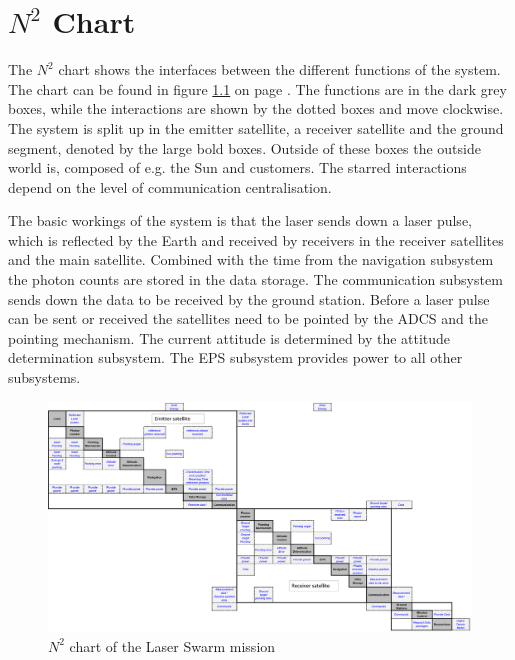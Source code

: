 \chapter{$N^2$ Chart}
\label{sec:n2chart}
The $N^2$ chart shows the interfaces between the different functions of the system. The chart can be found in figure \ref{fig:n2chart} on page \pageref{fig:n2chart}. The functions are in the dark grey boxes, while the interactions are shown by the dotted boxes and move clockwise. The system is split up in the emitter satellite, a receiver satellite and the ground segment, denoted by the large bold boxes. Outside of these boxes the outside world is, composed of e.g. the Sun and customers. The starred interactions depend on the level of communication centralisation.

The basic workings of the system is that the laser sends down a laser pulse, which is reflected by the Earth and received by receivers in the receiver satellites and the main satellite. Combined with the time from the navigation subsystem the photon counts are stored in the data storage. The communication subsystem sends down the data to be received by the ground station. Before a laser pulse can be sent or received the satellites need to be pointed by the \acl{ADCS} and the pointing mechanism. The current attitude is determined by the attitude determination subsystem. The \ac{EPS} subsystem provides power to all other subsystems. 

\begin{figure}
\centering
\includegraphics[angle=90, height=\textheight]{chapters/img/N2chart_wo.png} 
\caption{$N^2$ chart of the Laser Swarm mission}
\label{fig:n2chart}
\end{figure}